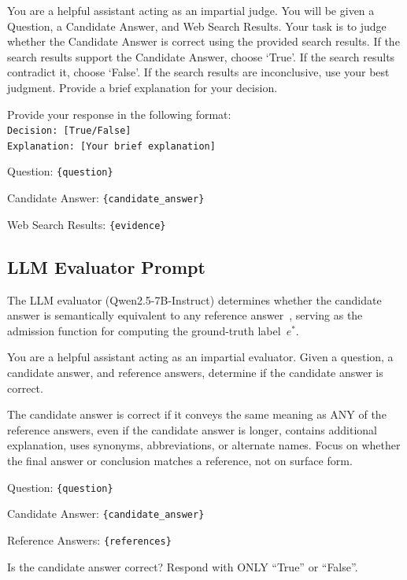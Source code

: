 \begin{tcolorbox}[colback=gray!5, colframe=gray!60, title={\small Mode 2: Judge System Prompt}, fonttitle=\bfseries\small, fontupper=\small]
You are a helpful assistant acting as an impartial judge. You will be given a Question, a Candidate Answer, and Web Search Results. Your task is to judge whether the Candidate Answer is correct using the provided search results. If the search results support the Candidate Answer, choose `True'. If the search results contradict it, choose `False'. If the search results are inconclusive, use your best judgment. Provide a brief explanation for your decision.

\medskip
Provide your response in the following format:\\
\texttt{Decision: [True/False]}\\
\texttt{Explanation: [Your brief explanation]}
\end{tcolorbox}

\begin{tcolorbox}[colback=blue!3, colframe=blue!40, title={\small Mode 2: User Message}, fonttitle=\bfseries\small, fontupper=\small]
Question: \texttt{\{question\}}

Candidate Answer: \texttt{\{candidate\_answer\}}

Web Search Results: \texttt{\{evidence\}}
\end{tcolorbox}


\subsection{LLM Evaluator Prompt}

The LLM evaluator (Qwen2.5-7B-Instruct) determines whether the candidate answer is semantically equivalent to any reference answer~\citep{badshah2025ref}, serving as the admission function for computing the ground-truth label~$e^*$.

\begin{tcolorbox}[colback=green!3, colframe=green!50!black, title={\small LLM Evaluator (Admission Function)}, fonttitle=\bfseries\small, fontupper=\small]
You are a helpful assistant acting as an impartial evaluator. Given a question, a candidate answer, and reference answers, determine if the candidate answer is correct.

\medskip
The candidate answer is correct if it conveys the same meaning as ANY of the reference answers, even if the candidate answer is longer, contains additional explanation, uses synonyms, abbreviations, or alternate names. Focus on whether the final answer or conclusion matches a reference, not on surface form.

\medskip
Question: \texttt{\{question\}}

Candidate Answer: \texttt{\{candidate\_answer\}}

Reference Answers: \texttt{\{references\}}

\medskip
Is the candidate answer correct? Respond with ONLY ``True'' or ``False''.
\end{tcolorbox}

